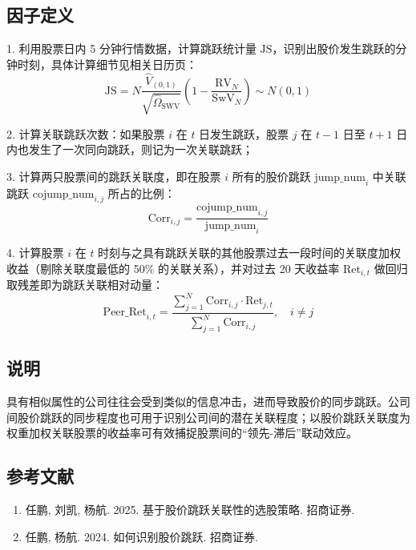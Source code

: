 \documentclass{article}
\begin{document}
\subsection{因子定义}

1. 利用股票日内 5 分钟行情数据，计算跳跃统计量 \( \mathrm{JS} \)，识别出股价发生跳跃的分钟时刻，具体计算细节见相关日历页：
\begin{equation}
    \mathrm{JS} = N \frac{\hat{V}_{(0,1)}}{\sqrt{\hat{\Omega}_{\mathrm{SWV}}}} \left( 1 - \frac{\mathrm{RV}_N}{\mathrm{SwV}_N} \right) \sim N(0,1)
\end{equation}

2. 计算关联跳跃次数：如果股票 \( i \) 在 \( t \) 日发生跳跃，股票 \( j \) 在 \( t-1 \) 日至 \( t+1 \) 日内也发生了一次同向跳跃，则记为一次关联跳跃；

3. 计算两只股票间的跳跃关联度，即在股票 \( i \) 所有的股价跳跃 \( \mathrm{jump\_num}_i \) 中关联跳跃 \( \mathrm{cojump\_num}_{i,j} \) 所占的比例：
\begin{equation}
    \mathrm{Corr}_{i,j} = \frac{\mathrm{cojump\_num}_{i,j}}{\mathrm{jump\_num}_i}
\end{equation}

4. 计算股票 \( i \) 在 \( t \) 时刻与之具有跳跃关联的其他股票过去一段时间的关联度加权收益（剔除关联度最低的 50\% 的关联关系），并对过去 20 天收益率 \( \mathrm{Ret}_{i,t} \) 做回归取残差即为跳跃关联相对动量：
\begin{equation}
    \mathrm{Peer\_Ret}_{i,t} = \frac{\sum_{j=1}^{N} \mathrm{Corr}_{i,j} \cdot \mathrm{Ret}_{j,t}}{\sum_{j=1}^{N} \mathrm{Corr}_{i,j}}, \quad i \neq j
\end{equation}


\subsection{说明}
具有相似属性的公司往往会受到类似的信息冲击，进而导致股价的同步跳跃。公司间股价跳跃的同步程度也可用于识别公司间的潜在关联程度；以股价跳跃关联度为权重加权关联股票的收益率可有效捕捉股票间的“领先-滞后”联动效应。

\subsection{参考文献}
\begin{enumerate}
    \item 任鹏, 刘凯, 杨航. 2025. 基于股价跳跃关联性的选股策略. 招商证券.
    \item 任鹏, 杨航. 2024. 如何识别股价跳跃. 招商证券.
\end{enumerate}
\end{document}
